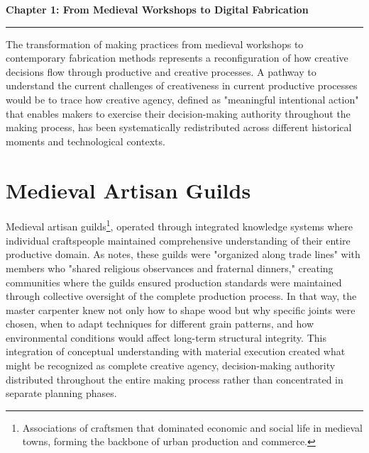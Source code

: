 \setcounter{chapter}{1}
\setcounter{section}{0}


\pagestyle{fancy}
\fancyhf{} %
\fancyfoot[C]{\thepage} 
\renewcommand{\headrulewidth}{0pt}
\renewcommand{\footrulewidth}{0pt}

\noindent
{\Large\textbf{Chapter 1: From Medieval Workshops to Digital Fabrication}}
\vspace{0.3cm}
\hrule
\vspace{0.8cm}
\label{ch:introduction}

\setlength{\parindent}{0pt}

The transformation of making practices from medieval workshops to contemporary fabrication methods represents a reconfiguration of how creative decisions flow through productive and creative processes. A pathway to understand the current challenges of creativeness in current productive processes would be to trace how creative agency, defined as "meaningful intentional action" \citep{niedderer2024} that enables makers to exercise their decision-making authority throughout the making process, has been systematically redistributed across different historical moments and technological contexts.

\section{Medieval Artisan Guilds}

Medieval artisan guilds\footnote{Associations of craftsmen that dominated economic and social life in medieval towns, forming the backbone of urban production and commerce.}, operated through integrated knowledge systems where individual craftspeople maintained comprehensive understanding of their entire productive domain. As \citet{richardson2008} notes, these guilds were "organized along trade lines" with members who "shared religious observances and fraternal dinners," creating communities where the guilds ensured production standards were maintained through collective oversight of the complete production process. In that way, the master carpenter knew not only how to shape wood but why specific joints were chosen, when to adapt techniques for different grain patterns, and how environmental conditions would affect long-term structural integrity. This integration of conceptual understanding with material execution created what might be recognized as complete creative agency, decision-making authority distributed throughout the entire making process rather than concentrated in separate planning phases.

